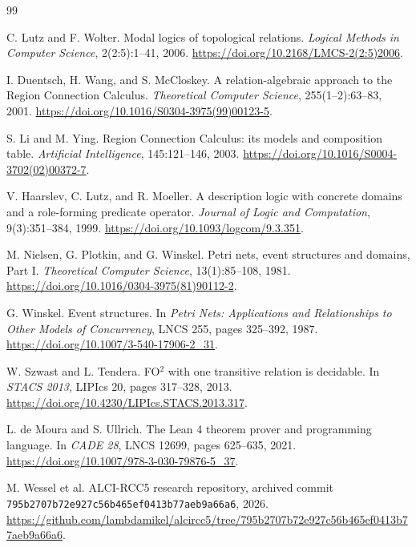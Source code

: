 \documentclass[11pt]{article}
\begin{document}
\begin{thebibliography}{99}

C. Lutz and F. Wolter.
\newblock Modal logics of topological relations.
\newblock \emph{Logical Methods in Computer Science}, 2(2:5):1--41, 2006.
\newblock \url{https://doi.org/10.2168/LMCS-2(2:5)2006}.

I. Duentsch, H. Wang, and S. McCloskey.
\newblock A relation-algebraic approach to the Region Connection Calculus.
\newblock \emph{Theoretical Computer Science}, 255(1--2):63--83, 2001.
\newblock \url{https://doi.org/10.1016/S0304-3975(99)00123-5}.

S. Li and M. Ying.
\newblock Region Connection Calculus: its models and composition table.
\newblock \emph{Artificial Intelligence}, 145:121--146, 2003.
\newblock \url{https://doi.org/10.1016/S0004-3702(02)00372-7}.

V. Haarslev, C. Lutz, and R. Moeller.
\newblock A description logic with concrete domains and a role-forming
predicate operator.
\newblock \emph{Journal of Logic and Computation}, 9(3):351--384, 1999.
\newblock \url{https://doi.org/10.1093/logcom/9.3.351}.

M. Nielsen, G. Plotkin, and G. Winskel.
\newblock Petri nets, event structures and domains, Part I.
\newblock \emph{Theoretical Computer Science}, 13(1):85--108, 1981.
\newblock \url{https://doi.org/10.1016/0304-3975(81)90112-2}.

G. Winskel.
\newblock Event structures.
\newblock In \emph{Petri Nets: Applications and Relationships to Other Models
of Concurrency}, LNCS 255, pages 325--392, 1987.
\newblock \url{https://doi.org/10.1007/3-540-17906-2_31}.

W. Szwast and L. Tendera.
\newblock FO\({}^2\) with one transitive relation is decidable.
\newblock In \emph{STACS 2013}, LIPIcs 20, pages 317--328, 2013.
\newblock \url{https://doi.org/10.4230/LIPIcs.STACS.2013.317}.

L. de Moura and S. Ullrich.
\newblock The Lean 4 theorem prover and programming language.
\newblock In \emph{CADE 28}, LNCS 12699, pages 625--635, 2021.
\newblock \url{https://doi.org/10.1007/978-3-030-79876-5_37}.

M. Wessel et al.
\newblock ALCI-RCC5 research repository, archived commit
\nolinkurl{795b2707b72e927c56b465ef0413b77aeb9a66a6}, 2026.
\newblock \url{https://github.com/lambdamikel/alcircc5/tree/795b2707b72e927c56b465ef0413b77aeb9a66a6}.

\end{thebibliography}
\end{document}
